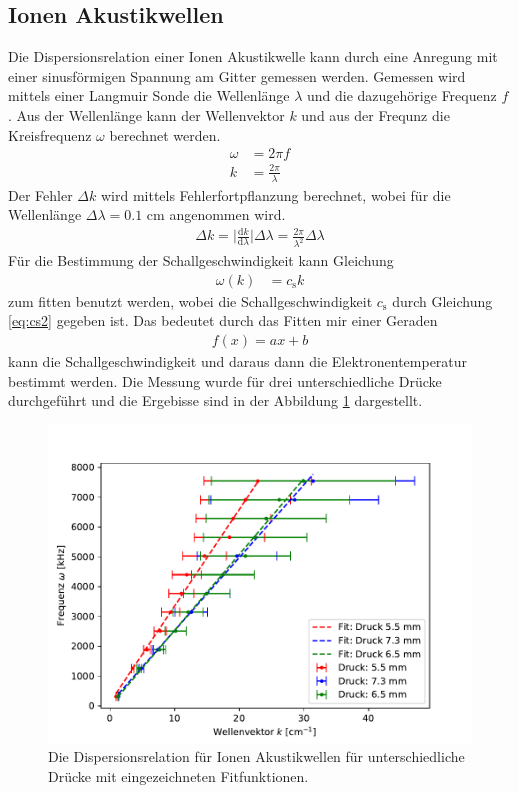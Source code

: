 \subsection{Ionen Akustikwellen}
Die Dispersionsrelation einer Ionen Akustikwelle kann durch eine Anregung mit einer sinusförmigen Spannung am Gitter gemessen werden. Gemessen wird mittels einer Langmuir Sonde die Wellenlänge $\lambda$ und die dazugehörige Frequenz $f$. Aus der Wellenlänge kann der Wellenvektor $k$ und aus der Frequnz die Kreisfrequenz  $\omega$ berechnet werden.
\begin{align}
  \omega & = 2 \pi f \\
  k & = \frac{2 \pi}{\lambda}
\end{align}
Der Fehler $\Delta k$ wird mittels Fehlerfortpflanzung berechnet, wobei für die Wellenlänge $\Delta \lambda=0.1$ cm angenommen wird.
\begin{align}
  \Delta k = \bigl| \frac{\mathrm{d} k}{\mathrm{d} \lambda} \bigl| \Delta \lambda = \frac{2\pi}{\lambda^2} \Delta \lambda
\end{align}
Für die Bestimmung der Schallgeschwindigkeit kann Gleichung
\begin{align}
\omega (k)
    &=c_\text{s}k
\end{align}
zum fitten benutzt werden, wobei die Schallgeschwindigkeit $c_{\mathrm{s}}$ durch Gleichung \eqref{eq:cs2} gegeben ist. Das bedeutet durch das Fitten mir einer Geraden
\begin{align}
  f(x)= a x +b
  \label{eq:fit_Dispersion}
\end{align}
kann die Schallgeschwindigkeit und daraus dann die Elektronentemperatur bestimmt werden. Die Messung wurde für drei unterschiedliche Drücke durchgeführt und die Ergebisse sind in der Abbildung \ref{fig:3_3_Dispersion} dargestellt.
\begin{figure}[H]
\centering
\includegraphics[scale=0.6]{3_3_Dispersion.pdf}
\caption{Die Dispersionsrelation für Ionen Akustikwellen für unterschiedliche Drücke mit eingezeichneten Fitfunktionen.}
\label{fig:3_3_Dispersion}
\end{figure}
